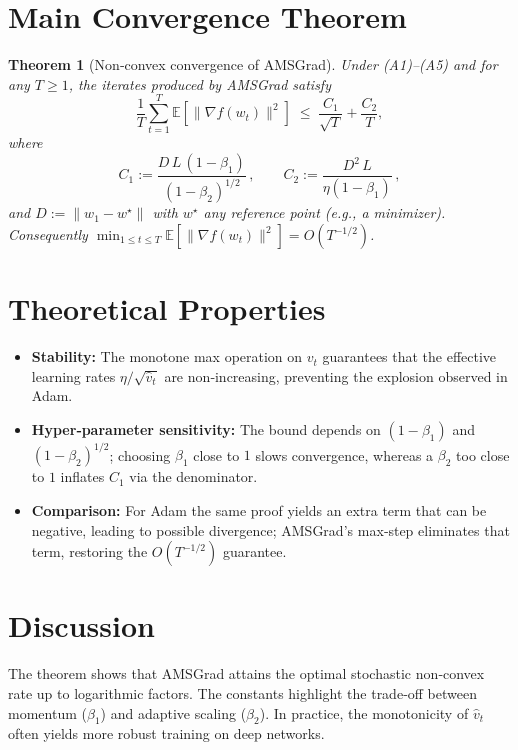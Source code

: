 \documentclass{article}
\newtheorem{theorem}{Theorem}
\newcommand{\E}{\mathbb{E}}
\begin{document}
\section*{Main Convergence Theorem}
\begin{theorem}[Non‑convex convergence of AMSGrad]\label{thm:main}
Under (A1)–(A5) and for any $T\ge1$, the iterates produced by AMSGrad satisfy
\[
\frac{1}{T}\sum_{t=1}^{T}\E\!\left[\|\nabla f(w_t)\|^2\right]
\;\le\;
\frac{C_1}{\sqrt{T}}+\frac{C_2}{T},
\]
where
\[
C_1:=\frac{D\,L\,(1-\beta_1)}{(1-\beta_2)^{1/2}}\,,\qquad
C_2:=\frac{D^2\,L}{\eta(1-\beta_1)}\,,
\]
and $D:=\|w_1-w^\star\|$ with $w^\star$ any reference point (e.g., a minimizer).  
Consequently $\min_{1\le t\le T}\E[\|\nabla f(w_t)\|^2]=O(T^{-1/2})$.
\end{theorem}

\section*{Theoretical Properties}
\begin{itemize}
\item \textbf{Stability:} The monotone max operation on $v_t$ guarantees that the effective learning rates $\eta/\sqrt{\hat v_t}$ are non‑increasing, preventing the explosion observed in Adam.
\item \textbf{Hyper‑parameter sensitivity:} The bound depends on $(1-\beta_1)$ and $(1-\beta_2)^{1/2}$; choosing $\beta_1$ close to $1$ slows convergence, whereas a $\beta_2$ too close to $1$ inflates $C_1$ via the denominator.
\item \textbf{Comparison:} For Adam the same proof yields an extra term that can be negative, leading to possible divergence; AMSGrad’s max‑step eliminates that term, restoring the $O(T^{-1/2})$ guarantee.
\end{itemize}

\section*{Discussion}
The theorem shows that AMSGrad attains the optimal stochastic non‑convex rate up to logarithmic factors. The constants highlight the trade‑off between momentum ($\beta_1$) and adaptive scaling ($\beta_2$). In practice, the monotonicity of $\hat v_t$ often yields more robust training on deep networks.
\end{document}
